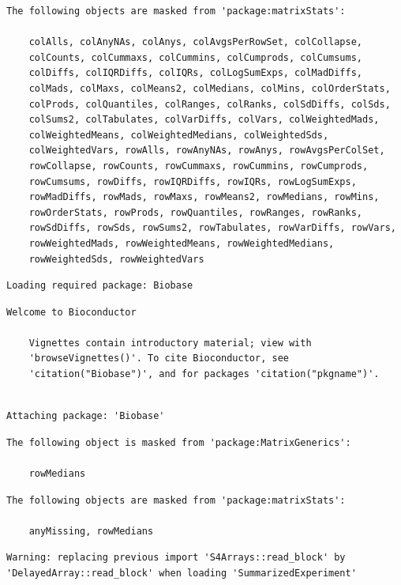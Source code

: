 \documentclass[
  letterpaper,
  DIV=11,
  numbers=noendperiod]{scrartcl}
\begin{document}
\begin{verbatim}
The following objects are masked from 'package:matrixStats':

    colAlls, colAnyNAs, colAnys, colAvgsPerRowSet, colCollapse,
    colCounts, colCummaxs, colCummins, colCumprods, colCumsums,
    colDiffs, colIQRDiffs, colIQRs, colLogSumExps, colMadDiffs,
    colMads, colMaxs, colMeans2, colMedians, colMins, colOrderStats,
    colProds, colQuantiles, colRanges, colRanks, colSdDiffs, colSds,
    colSums2, colTabulates, colVarDiffs, colVars, colWeightedMads,
    colWeightedMeans, colWeightedMedians, colWeightedSds,
    colWeightedVars, rowAlls, rowAnyNAs, rowAnys, rowAvgsPerColSet,
    rowCollapse, rowCounts, rowCummaxs, rowCummins, rowCumprods,
    rowCumsums, rowDiffs, rowIQRDiffs, rowIQRs, rowLogSumExps,
    rowMadDiffs, rowMads, rowMaxs, rowMeans2, rowMedians, rowMins,
    rowOrderStats, rowProds, rowQuantiles, rowRanges, rowRanks,
    rowSdDiffs, rowSds, rowSums2, rowTabulates, rowVarDiffs, rowVars,
    rowWeightedMads, rowWeightedMeans, rowWeightedMedians,
    rowWeightedSds, rowWeightedVars
\end{verbatim}

\begin{verbatim}
Loading required package: Biobase
\end{verbatim}

\begin{verbatim}
Welcome to Bioconductor

    Vignettes contain introductory material; view with
    'browseVignettes()'. To cite Bioconductor, see
    'citation("Biobase")', and for packages 'citation("pkgname")'.
\end{verbatim}

\begin{verbatim}

Attaching package: 'Biobase'
\end{verbatim}

\begin{verbatim}
The following object is masked from 'package:MatrixGenerics':

    rowMedians
\end{verbatim}

\begin{verbatim}
The following objects are masked from 'package:matrixStats':

    anyMissing, rowMedians
\end{verbatim}

\begin{verbatim}
Warning: replacing previous import 'S4Arrays::read_block' by
'DelayedArray::read_block' when loading 'SummarizedExperiment'
\end{verbatim}
\end{document}
